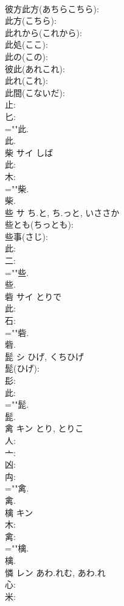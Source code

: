 \documentclass[8pt]{extreport}
\begin{document}
\begin{CJK}{UTF8}{min}
\\	彼方此方(あちらこちら): 
\\	此方(こちら): 
\\	此れから(これから): 
\\	此処(ここ): 
\\	此の(この): 
\\	彼此(あれこれ): 
\\	此れ(これ): 
\\	此間(こないだ): 
\\	止: 
\\	匕: 
\\	=""此.
\\	此.
\\	柴	サイ	しば		
\\	此: 
\\	木: 
\\	=""柴.
\\	柴.
\\	些	サ	ち.と, ち.っと, いささか		
\\	些とも(ちっとも): 
\\	些事(さじ): 
\\	此: 
\\	二: 
\\	=""些.
\\	些.
\\	砦	サイ	とりで		
\\	此: 
\\	石: 
\\	=""砦.
\\	砦.
\\	髭	シ	ひげ, くちひげ		
\\	髭(ひげ): 
\\	髟: 
\\	此: 
\\	=""髭.
\\	髭.
\\	禽	キン	とり, とりこ		
\\	人: 
\\	亠: 
\\	凶: 
\\	禸: 
\\	=""禽.
\\	禽.
\\	檎	キン			
\\	木: 
\\	禽: 
\\	=""檎.
\\	檎.
\\	憐	レン	あわ.れむ, あわ.れ		
\\	心: 
\\	米: 

\end{CJK}
\end{document}
